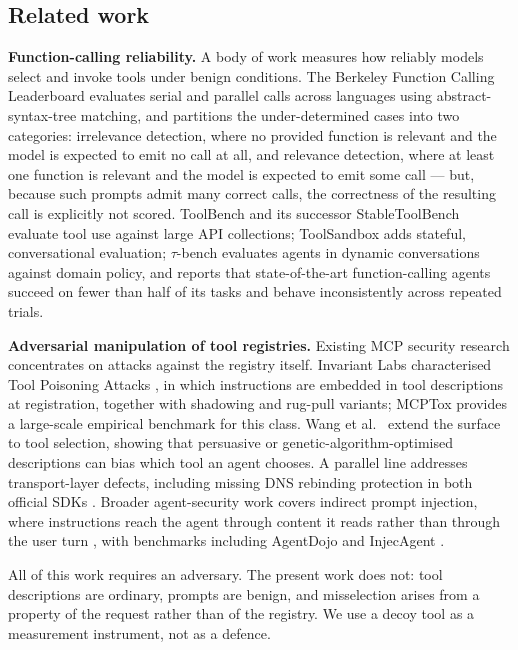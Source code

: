 \documentclass[
  11pt]{article}
\begin{document}
\hypertarget{related-work}{%
\subsection{Related work}\label{related-work}}

\textbf{Function-calling reliability.} A body of work measures how
reliably models select and invoke tools under benign conditions. The
Berkeley Function Calling Leaderboard \cite{bfcl2025} evaluates serial
and parallel calls across languages using abstract-syntax-tree matching,
and partitions the under-determined cases into two categories:
irrelevance detection, where no provided function is relevant and the
model is expected to emit no call at all, and relevance detection, where
at least one function is relevant and the model is expected to emit some
call --- but, because such prompts admit many correct calls, the
correctness of the resulting call is explicitly not scored. ToolBench
\cite{toolllm2023} and its successor StableToolBench
\cite{stabletoolbench2025} evaluate tool use against large API
collections; ToolSandbox \cite{toolsandbox2025} adds stateful,
conversational evaluation; \(\tau\)-bench \cite{taubench2024} evaluates
agents in dynamic conversations against domain policy, and reports that
state-of-the-art function-calling agents succeed on fewer than half of
its tasks and behave inconsistently across repeated trials.

\textbf{Adversarial manipulation of tool registries.} Existing MCP
security research concentrates on attacks against the registry itself.
Invariant Labs characterised Tool Poisoning Attacks
\cite{invariant2025}, in which instructions are embedded in tool
descriptions at registration, together with shadowing and rug-pull
variants; MCPTox \cite{mcptox2025} provides a large-scale empirical
benchmark for this class. Wang et al.~\cite{mpma2025} extend the surface
to tool selection, showing that persuasive or
genetic-algorithm-optimised descriptions can bias which tool an agent
chooses. A parallel line addresses transport-layer defects, including
missing DNS rebinding protection in both official SDKs
\cite{cve202566416,cve202566414}. Broader agent-security work covers
indirect prompt injection, where instructions reach the agent through
content it reads rather than through the user turn \cite{greshake2023},
with benchmarks including AgentDojo \cite{agentdojo2024} and InjecAgent
\cite{injecagent2024}.

All of this work requires an adversary. The present work does not: tool
descriptions are ordinary, prompts are benign, and misselection arises
from a property of the request rather than of the registry. We use a
decoy tool as a measurement instrument, not as a defence.
\end{document}
